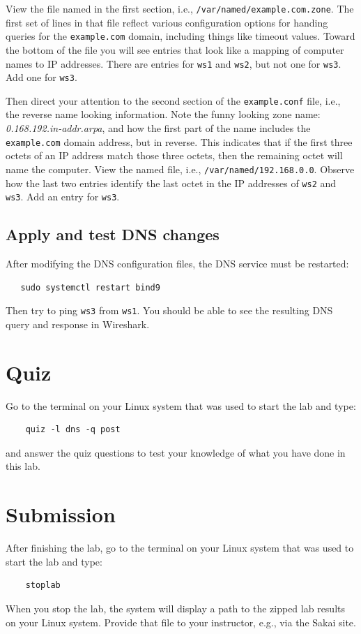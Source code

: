 View the file named in the first section, i.e., {\tt /var/named/example.com.zone}.  The first set of lines
in that file reflect various configuration options for handing queries for the {\tt example.com} domain,
including things like timeout values.  Toward the bottom of the file you will see entries that look like
a mapping of computer names to IP addresses.  There are entries for {\tt ws1} and {\tt ws2}, but not one
for {\tt ws3}.  Add one for {\tt ws3}.

Then direct your attention to the second section of the {\tt example.conf} file, i.e., the reverse name
looking information.
Note the funny looking zone name: \textit{0.168.192.in-addr.arpa}, and how the first part of the name
includes the {\tt example.com} domain address, but in reverse.  This indicates that if the first three
octets of an IP address match those three octets, then the remaining octet will name the computer.
View the named file, i.e., {\tt /var/named/192.168.0.0}. Observe how the last two entries identify the 
last octet in the IP addresses of {\tt ws2} and {\tt ws3}.  Add an entry for {\tt ws3}.

\subsection{Apply and test DNS changes}
After modifying the DNS configuration files, the DNS service must be restarted:
\begin{verbatim}
   sudo systemctl restart bind9
\end{verbatim}

\noindent Then try to ping {\tt ws3} from {\tt ws1}.  You should be able to see the resulting DNS query
and response in Wireshark.

\section{Quiz}
Go to the terminal on your Linux system that was used to start the lab and type:
\begin{verbatim}
    quiz -l dns -q post
\end{verbatim}
\noindent and answer the quiz questions to test your knowledge of what you have done in this lab.

\section{Submission}
After finishing the lab, go to the terminal on your Linux system that was used to start the lab and type:
\begin{verbatim}
    stoplab 
\end{verbatim}
When you stop the lab, the system will display a path to the zipped lab results on your Linux system.  Provide that file to 
your instructor, e.g., via the Sakai site.


\copyrightnotice


